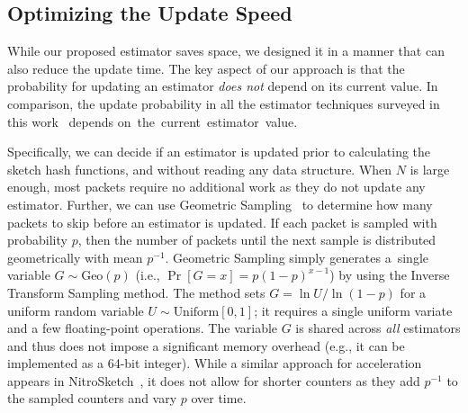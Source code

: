 \subsection{Optimizing the Update Speed}
While our proposed estimator saves space, we designed it in a manner that can also reduce the update time. The key aspect of our approach is that the probability for updating an estimator \emph{does not} depend on its current value. In comparison, the update probability in all the estimator techniques surveyed in this work~\cite{ICE-Buckets,CASE,CEDAR,ANLSUpscaling,DISCO,SAC,Infocom2019} depends \mbox{on the current estimator value.}

Specifically, we can decide if an estimator is updated prior to calculating the sketch hash functions, and without reading any data structure. When $N$ is large enough, most packets require no additional work as they do not update any estimator. 
Further, we can use Geometric Sampling~\cite{Nitro} to determine how many packets to skip before an estimator is updated. If each packet is sampled with probability $p$, then the number of packets until the next sample is distributed geometrically with mean $p^{-1}$. Geometric Sampling simply generates \mbox{a single} variable $G\sim \mbox{Geo}(p)$ (i.e., $\Pr[G=x]=p(1-p)^{x-1}$) by using the Inverse Transform Sampling method.
The method sets $G=\ln U / \ln (1-p)$ for a uniform random variable $U\sim\mbox{Uniform}[0,1]$; it requires a single uniform variate and a few floating-point operations. The variable $G$ is shared across \emph{all} estimators and thus does not impose a significant memory overhead (e.g., it can be implemented as a 64-bit integer). 
While a similar approach for acceleration appears in NitroSketch~\cite{Nitro}, it does not allow for shorter counters as they add $p^{-1}$ to the sampled counters and vary $p$ over time. 


